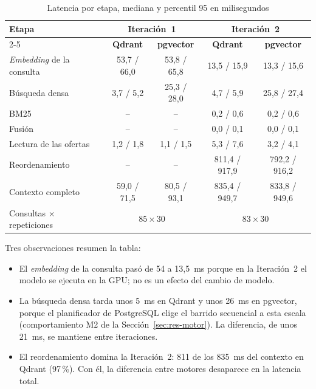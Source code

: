 \begin{table}[htbp!]
    \centering
    \caption{Latencia por etapa, mediana y percentil 95 en milisegundos}
    \label{tab:res-pe3-local}
    \small
    \begin{tabular}{|l|c|c|c|c|}
        \hline
        \multirow{2}{*}{\textbf{Etapa}} & \multicolumn{2}{c|}{\textbf{Iteración~1}} & \multicolumn{2}{c|}{\textbf{Iteración~2}} \\
        \cline{2-5}
         & \textbf{Qdrant} & \textbf{pgvector} & \textbf{Qdrant} & \textbf{pgvector} \\
        \hline
        \textit{Embedding} de la consulta & 53,7 / 66,0 & 53,8 / 65,8 & 13,5 / 15,9 & 13,3 / 15,6 \\
        \hline
        Búsqueda densa & 3,7 / 5,2 & 25,3 / 28,0 & 4,7 / 5,9 & 25,8 / 27,4 \\
        \hline
        BM25 & -- & -- & 0,2 / 0,6 & 0,2 / 0,6 \\
        \hline
        Fusión & -- & -- & 0,0 / 0,1 & 0,0 / 0,1 \\
        \hline
        Lectura de las ofertas & 1,2 / 1,8 & 1,1 / 1,5 & 5,3 / 7,6 & 3,2 / 4,1 \\
        \hline
        Reordenamiento & -- & -- & 811,4 / 917,9 & 792,2 / 916,2 \\
        \hline
        Contexto completo & 59,0 / 71,5 & 80,5 / 93,1 & 835,4 / 949,7 & 833,8 / 949,6 \\
        \hline
        Consultas $\times$ repeticiones & \multicolumn{2}{c|}{$85 \times 30$} & \multicolumn{2}{c|}{$83 \times 30$} \\
        \hline
    \end{tabular}
\end{table}

Tres observaciones resumen la tabla:
\begin{itemize}
    \item El \textit{embedding} de la consulta pasó de 54 a 13,5~ms porque en la Iteración~2 el modelo se ejecuta en la GPU; no es un efecto del cambio de modelo.
    \item La búsqueda densa tarda unos 5~ms en Qdrant y unos 26~ms en pgvector, porque el planificador de PostgreSQL elige el barrido secuencial a esta escala (comportamiento M2 de la Sección~\ref{sec:res-motor}). La diferencia, de unos 21~ms, se mantiene entre iteraciones.
    \item El reordenamiento domina la Iteración~2: 811 de los 835~ms del contexto en Qdrant (97\,\%). Con él, la diferencia entre motores desaparece en la latencia total.
\end{itemize}

